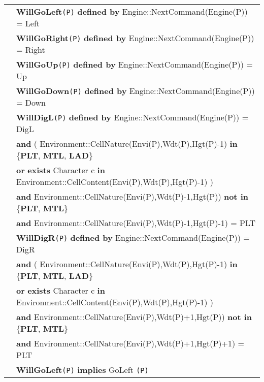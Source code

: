 \documentclass{article}
\begin{document}
\begin{tabular}{rl}
& \textbf{WillGoLeft}\texttt{(P)} \textbf{defined by}  \textrm{Engine::NextCommand(Engine(P))  = Left}\\

& \textbf{WillGoRight}\texttt{(P)} \textbf{defined by}   \textrm{Engine::NextCommand(Engine(P))  = Right}\\

& \textbf{WillGoUp}\texttt{(P)} \textbf{defined by}   \textrm{Engine::NextCommand(Engine(P))  = Up}\\

& \textbf{WillGoDown}\texttt{(P)} \textbf{defined by}  \textrm{Engine::NextCommand(Engine(P))  = Down}\\

&\textbf{WillDigL}\texttt{(P)} \textbf{defined by}  \textrm{Engine::NextCommand(Engine(P))  = DigL}\\
& \quad \textbf{and} ( \textrm{Environment::CellNature(Envi(P),Wdt(P),Hgt(P)-1)} \textbf{in} \{\textbf{PLT}, \textbf{MTL}, \textbf{LAD}\} \\
& \quad\quad\quad\quad \textbf{or} \textbf{exists} \textrm{Character} c \textbf{in} \textrm{Environment::CellContent(Envi(P),Wdt(P),Hgt(P)-1)} ) \\
& \quad \textbf{and} \textrm{Environment::CellNature(Envi(P),Wdt(P)-1,Hgt(P))} \textbf{not in} \{\textbf{PLT}, \textbf{MTL}\} \\
& \quad \textbf{and} \textrm{Environment::CellNature(Envi(P),Wdt(P)-1,Hgt(P)-1)} = \textrm{PLT} \\

&\textbf{WillDigR}\texttt{(P)} \textbf{defined by}  \textrm{Engine::NextCommand(Engine(P))  = DigR}\\
& \quad \textbf{and} ( \textrm{Environment::CellNature(Envi(P),Wdt(P),Hgt(P)-1)} \textbf{in} \{\textbf{PLT}, \textbf{MTL}, \textbf{LAD}\} \\
& \quad\quad\quad\quad \textbf{or} \textbf{exists} \textrm{Character} c \textbf{in} \textrm{Environment::CellContent(Envi(P),Wdt(P),Hgt(P)-1)} ) \\
& \quad \textbf{and} \textrm{Environment::CellNature(Envi(P),Wdt(P)+1,Hgt(P))} \textbf{not in} \{\textbf{PLT}, \textbf{MTL}\} \\
& \quad \textbf{and} \textrm{Environment::CellNature(Envi(P),Wdt(P)+1,Hgt(P)+1)} = \textrm{PLT} \\

& \textbf{WillGoLeft}\texttt{(P)}  \textbf{implies} \textrm{GoLeft} \texttt{(P)}\\ 


\end{tabular}
\end{document}
